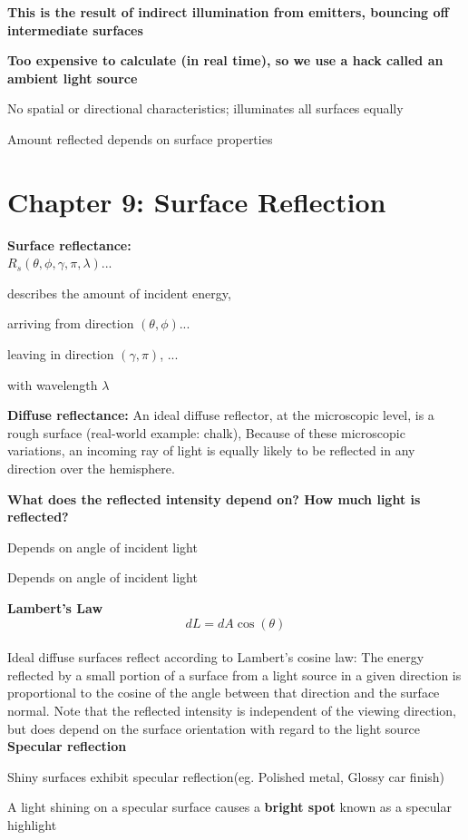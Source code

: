 \documentclass[]{report}
\begin{document}
\textbf{This is the result of indirect illumination from emitters, bouncing off
intermediate surfaces}

\textbf{Too expensive to calculate (in real time), so we use a hack called an
	ambient light source}

No spatial or directional characteristics; illuminates all surfaces
equally

Amount reflected depends on surface properties

\section*{Chapter 9: Surface Reflection}
\textbf{Surface reflectance:}\\
\textbf{$R_s(\theta, \phi, \gamma, \pi, \lambda)$}...

describes the amount of incident energy,

arriving from direction $(\theta, \phi)$...

leaving in direction $(\gamma, \pi)$, ...

with wavelength $\lambda$

\textbf{Diffuse reflectance:} An ideal diffuse reflector, at the microscopic level, is a
rough surface (real-world example: chalk), Because of these microscopic variations, an incoming ray of
light is equally likely to be reflected in any direction over the
hemisphere. 

\textbf{What does the reflected intensity depend on? How much light is reflected?}

Depends on angle of incident light

Depends on angle of incident light

\textbf{Lambert’s Law}
$$dL = dA \cos(\theta)$$\\
Ideal diffuse surfaces reflect according to Lambert’s cosine
law: The energy reflected by a small portion of a surface from a light
source in a given direction is proportional to the cosine of the
angle between that direction and the surface normal. Note that the reflected intensity is independent of the
viewing direction, but does depend on the surface
orientation with regard to the light source\\
\textbf{Specular reflection}

Shiny surfaces exhibit specular reflection(eg. Polished metal, Glossy car finish)

A light shining on a specular surface causes a\textbf{ bright spot} known as a
specular highlight
\end{document}
